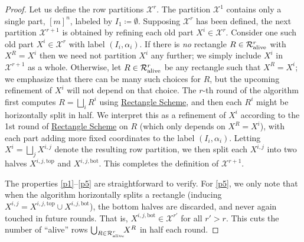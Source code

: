 \documentclass[11pt]{article}
\numberwithin{equation}{section}
\theoremstyle{definition}
\theoremstyle{plain}
\newcommand{\rectscheme}{\hyperref[alg:partition]{Rectangle Scheme}\xspace}
\newcommand{\calR}{\mathcal{R}}
\newcommand{\calX}{\mathcal{X}}
\newcommand{\allX}{[m]^n}
\newcommand{\alive}{\text{\upshape alive}}
\newcommand{\topp}{\text{top}}
\newcommand{\bott}{\text{bot}}
\begin{document}
\begin{proof}
Let us define the row partitions $\calX^r$.
The partition $\calX^1$ contains only a single part, $\allX$, labeled by $I_1\coloneqq \emptyset$. Supposing $\calX^r$ has been defined, the next partition $\calX^{r+1}$ is obtained by refining each old part $X^i\in\calX^r$. Consider one such old part $X^i\in\calX^r$ with label $(I_i,\alpha_i)$. If there is \emph{no} rectangle $R\in\calR^r_{\alive}$ with $X^R=X^i$ then we need not partition $X^i$ any further; we simply include $X^i$ in $\calX^{r+1}$ as a whole. Otherwise, let $R\in\calR^r_{\alive}$ be any rectangle such that $X^R=X^i$; we emphasize that there can be many such choices for $R$, but the upcoming refinement of $X^i$ will not depend on that choice. The $r$-th round of the algorithm first computes $R=\bigsqcup_i R^i$ using \rectscheme, and then each $R^i$ might be horizontally split in half. We interpret this as a refinement of $X^i$ according to the 1st round of \rectscheme on $R$ (which only depends on $X^R=X^i$), with each part adding more fixed coordinates to the label $(I_i, \alpha_i)$. Letting $X^i=\bigsqcup_j X^{i,j}$ denote the resulting row partition, we then split each $X^{i,j}$ into two halves $X^{i,j,\topp}$ and $X^{i,j,\bott}$. This completes the definition of $\calX^{r+1}$.

The properties \ref{p1}--\ref{p5} are straightforward to verify. For \ref{p5}, we only note that when the algorithm horizontally splits a rectangle (inducing $X^{i,j}=X^{i,j,\topp}\cup X^{i,j,\bott}$), the bottom halves are discarded, and never again touched in future rounds. That is, $X^{i,j,\bott}\in\calX^{r'}$ for all $r'>r$. This cuts the number of ``alive'' rows $\bigcup_{R\in\calR^r_{\alive}}\!\!X^R$ in half each round.
\end{proof}
\end{document}
